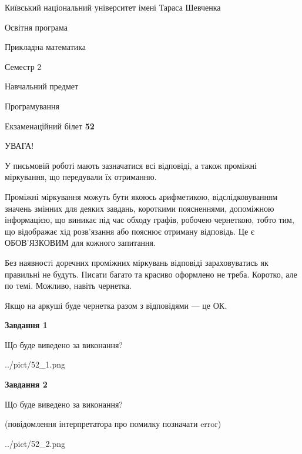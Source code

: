 \documentclass[12pt, ukrainian]{article}
\begin{document}
{{\begin {small}\par
{ \center  Київський національний університет імені Тараса Шевченка \par}
{\parbox {5 cm}{Освітня програма \hfill}{\parbox {7 cm}{Прикладна математика\hfill}}\parbox {6 cm}{\hfill Семестр 2}}\par
{\parbox {5 cm} {Навчальний предмет \hfill}\parbox {7 cm}{Програмування \hfill}\parbox {6cm}{\hfill}\par}\vspace{-7pt} \end{small}}{\center Екзаменаційний білет \No \textbf
{ 52 }\par}}
{
\begin {large}
УВАГА!

У письмовій роботі мають зазначатися всі відповіді, а також проміжні міркування, що передували їх отриманню.

Проміжні міркування можуть бути якоюсь арифметикою, відслідковуванням зна\-чень змінних для деяких завдань,
короткими поясненнями, допоміжною інформацією, що виникає під час обходу графів, робочею чернеткою,
тобто тим, що відображає хід розв’язання або пояснює отриману відповідь.
Це є ОБОВ’ЯЗКОВИМ для кожного запитання.

Без наявності доречних проміжних міркувань відповіді зараховуватись як правиль\-ні не будуть.
Писати багато та красиво оформлено не треба. Коротко, але по темі. Можли\-во, навіть чернетка.

Якщо на аркуші буде чернетка разом з відповідями --- це ОК.

\newpage

{\begin {center}\textbf{Завдання 1}\end {center}}\par
Що буде виведено за виконання?\par
\begin{center}
	{../pict/52_1.png}
\end{center}
\newpage

{\begin {center}\textbf{Завдання 2}\end {center}}\par
Що буде виведено за виконання?\par
 (повідомлення інтерпретатора про помилку позначати error)\par
\begin{center}
	{../pict/52_2.png}
\end{center}
\newpage


\end{large}}
\end{document}
